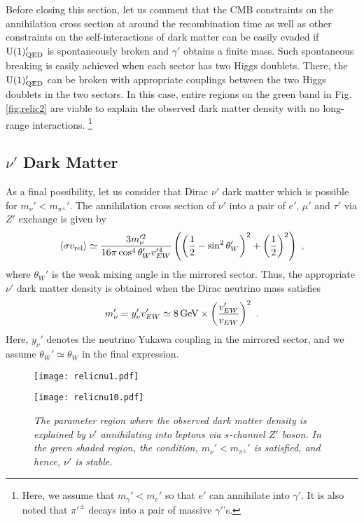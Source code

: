 \documentclass[aps,amsmath,preprint,epsf,superscriptaddress,nofootinbib,notitlepage]{revtex4-1}
\begin{document}
Before closing this section, let us comment that  the CMB constraints on the annihilation cross section at around the recombination time
as well as other constraints on the self-interactions of dark matter
can be easily evaded if $\text{U}(1)_{\rm QED}'$ is spontaneously broken and $\gamma'$ obtains 
a finite mass.
Such spontaneous breaking is easily achieved when each sector has two Higgs doublets.
There, the $\text{U}(1)_{\rm QED}'$ can be broken with appropriate couplings between
the two Higgs doublets in the two sectors.
In this case, entire regions on the green band in Fig.\,\ref{fig:relic2} are 
viable to explain the observed dark matter density with no long-range interactions.%
\footnote{Here, we assume that $m_{\gamma}' < m_e'$ so that $e'$ can annihilate into $\gamma'$.
It is also noted that $\pi'^\pm$ decays into a pair of massive $\gamma'$'s.}


\subsection{$\nu'$ Dark Matter}
As a final possibility, let us consider that Dirac $\nu'$ dark matter which is possible for $m_\nu' < m_{\pi^\pm}'$.
The annihilation cross section of $\nu'$ into a pair of $e'$, $\mu'$ and $\tau'$ via $Z'$ exchange 
is given by \cite{Lee:1977ua}
\begin{eqnarray}
\left\langle {\sigma v_{\rm rel}} \right\rangle \simeq \frac{3m_\nu'^2}{16\pi \cos^4\theta_W' v_{EW}'^4}
 \left(
\left(
\frac{1}{2} -\sin^2\theta_W'
\right)^2 + 
\left(
\frac{1}{2}
\right)^2
\right)\ ,
\end{eqnarray}
where $\theta_W'$ is the weak mixing angle in the mirrored sector.
Thus, the appropriate $\nu'$ dark matter density is obtained when the Dirac neutrino mass satisfies
\begin{eqnarray}
\label{eq:nu1}
m_{\nu}' = y_\nu' v_{EW}' \simeq 8\,{\rm GeV}\times \left( \frac{v_{EW}'}{v_{EW}}\right)^2\ .
\end{eqnarray}
Here, $y_{\nu}'$ denotes the neutrino Yukawa coupling in the mirrored sector, and we assume $\theta_W'\simeq  \theta_W$ in the final expression.


\begin{figure}[t]
\begin{center}
 \begin{minipage}{.46\linewidth}
  \texttt{[image: relicnu1.pdf]}
 \end{minipage}
 \hspace{1cm}
 \begin{minipage}{.46\linewidth}
  \texttt{[image: relicnu10.pdf]}
 \end{minipage}
 \end{center}
\caption{\sl \small
The parameter region where the observed dark matter density is explained 
by $\nu'$ annihilating into leptons via $s$-channel $Z'$ boson. 
In the green shaded region, the condition, $m_\nu' < m_{\pi^\pm}'$ is satisfied, and hence,
$\nu'$ is stable.
}
\label{fig:nu1}
\end{figure}
\end{document}
